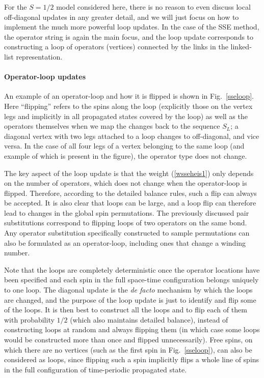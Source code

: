 \documentclass[draft,numberedheadings]{aipproc}
\begin{document}
For the $S=1/2$ model considered here, there is no reason to even discuss local off-diagonal updates in any greater detail, and we will just focus on how to 
implement the much more powerful loop updates. In the case of the SSE method, the operator string is again the main focus, and the loop update corresponds 
to constructing a loop of operators (vertices) connected by the links in the linked-list representation. 

\paragraph{Operator-loop updates}

An example of an operator-loop and how it is flipped is shown in Fig.~\ref{sseloop}. Here ``flipping'' refers to the spins along the loop (explicitly
those on the vertex legs and implicitly in all propagated states covered by the loop) as well as the operators themselves when we map the changes back 
to the sequence $S_L$; a diagonal vertex with two legs attached to a loop changes to off-diagonal, and vice versa. In the case of all four legs of a vertex 
belonging to the same loop (and example of which is present in the figure), the operator type does not change. 

The key aspect of the loop update is that the weight (\ref{wsseheis1}) only depends on the number of operators, which does not change when the operator-loop
is flipped. Therefore, according to the detailed balance rules, such a flip can always be accepted. It is also clear that loops can be large, and a loop 
flip can therefore lead to changes in the global spin permutations. The previously discussed pair substitutions correspond to flipping loops of two operators on 
the same bond. Any operator substitution specifically constructed to sample permutations can also be formulated as an operator-loop, including ones that change 
a winding number. 

Note that the loops are completely deterministic once the operator locations have been specified and each spin in the full space-time configuration belongs 
uniquely to one loop. The diagonal update is the {\it de facto} mechanism by which the loops are changed, and the purpose of the loop update is just to identify 
and flip some of the loops. It is then best to construct all the loops and to flip each of them with probability $1/2$ (which also maintains detailed balance), 
instead of constructing loops at random and always flipping them (in which case some loops would be constructed more than once and flipped unnecessarily). Free 
spins, on which there are no vertices (such as the first spin in Fig.~\ref{sseloop}), can also be considered as loops, since flipping such a spin implicitly 
flips a whole line of spins in the full configuration of time-periodic propagated state.
\end{document}
